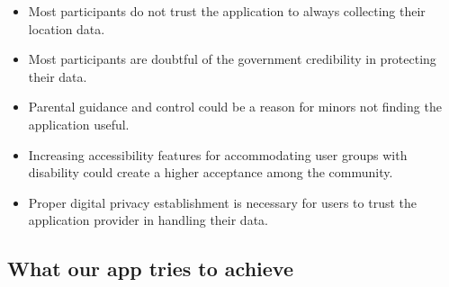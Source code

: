 \begin{enumerate}[1.]
\begin{itemize}
        \item Most participants do not trust the application to always collecting their location data.
        \item Most participants are doubtful of the government credibility in protecting their data. 
        \item Parental guidance and control could be a reason for minors not finding the application useful.
        \item Increasing accessibility features for accommodating user groups with disability could create a higher acceptance among the community.
        \item Proper digital privacy establishment is necessary for users to trust the application provider in handling their data.
      \end{itemize}
  \end{enumerate}

\subsection{What our app tries to achieve}
